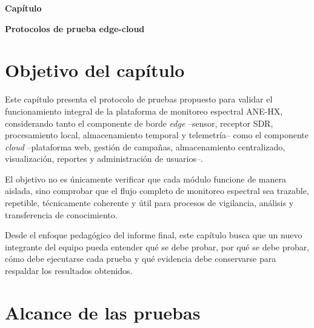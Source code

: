 \normalfont\color{black}
\clearpage

\setcounter{section}{0}
\setcounter{subsection}{0}
\setcounter{subsubsection}{0}
\setcounter{figure}{0}
\setcounter{table}{0}

{}

{\normalfont\huge\bfseries\color{black}Capítulo \thechapter\par}

\vspace{0.8cm}

{\normalfont\Huge\bfseries\color{black}Protocolos de prueba edge-cloud\par}

\vspace{1.2cm}

\normalcolor
\normalfont\color{black}

\section{Objetivo del capítulo}

Este capítulo presenta el protocolo de pruebas propuesto para validar el funcionamiento integral de la plataforma de monitoreo espectral ANE-HX, considerando tanto el componente de borde \textit{edge} --sensor, receptor SDR, procesamiento local, almacenamiento temporal y telemetría-- como el componente \textit{cloud} --plataforma web, gestión de campañas, almacenamiento centralizado, visualización, reportes y administración de usuarios--.

El objetivo no es únicamente verificar que cada módulo funcione de manera aislada, sino comprobar que el flujo completo de monitoreo espectral sea trazable, repetible, técnicamente coherente y útil para procesos de vigilancia, análisis y transferencia de conocimiento.

Desde el enfoque pedagógico del informe final, este capítulo busca que un nuevo integrante del equipo pueda entender qué se debe probar, por qué se debe probar, cómo debe ejecutarse cada prueba y qué evidencia debe conservarse para respaldar los resultados obtenidos.

\section{Alcance de las pruebas}

